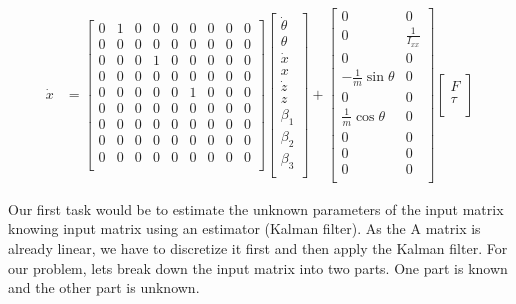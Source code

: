 \documentclass[12pt]{article}
\begin{document}
{\begin{align*}
    \dot{x} &= \begin{bmatrix}
        0 & 1 & 0 & 0 & 0 & 0 & 0 & 0 & 0 \\
        0 & 0 & 0 & 0 & 0 & 0 & 0 & 0 & 0 \\
        0 & 0 & 0 & 1 & 0 & 0 & 0 & 0 & 0 \\
        0 & 0 & 0 & 0 & 0 & 0 & 0 & 0 & 0 \\
        0 & 0 & 0 & 0 & 0 & 1 & 0 & 0 & 0 \\
        0 & 0 & 0 & 0 & 0 & 0 & 0 & 0 & 0 \\
        0 & 0 & 0 & 0 & 0 & 0 & 0 & 0 & 0 \\
        0 & 0 & 0 & 0 & 0 & 0 & 0 & 0 & 0 \\
        0 & 0 & 0 & 0 & 0 & 0 & 0 & 0 & 0 \\
    \end{bmatrix} \begin{bmatrix}
        \dot{\theta} \\
        \theta \\
        \dot{x} \\
        x \\
        \dot{z} \\
        z \\
        \beta_1 \\
        \beta_2 \\
        \beta_3 \\
    \end{bmatrix} + \begin{bmatrix}
        0 & 0 \\
        0 & \frac{1}{I_{xx}} \\
        0 & 0 \\
        - \frac{1}{m} \sin{\theta} & 0 \\
        0 & 0 \\
        \frac{1}{m} \cos{\theta} & 0 \\
        0 & 0 \\
        0 & 0 \\
        0 & 0 \\
    \end{bmatrix} \begin{bmatrix}
        F \\
        \tau \\
    \end{bmatrix} 
\end{align*}

Our first task would be to estimate the unknown parameters of the input matrix knowing input matrix using an estimator (Kalman filter). As the A matrix is already linear, we have to discretize it first and then apply the Kalman filter. For our problem, lets break down the input matrix into two parts. One part is known and the other part is unknown.


}
\end{document}
